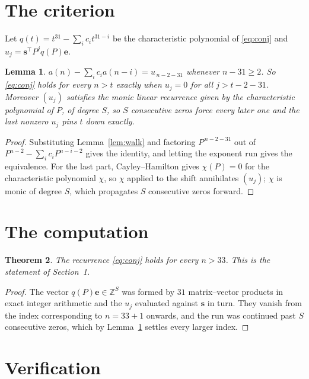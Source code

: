 \documentclass[11pt,a4paper]{article}
\theoremstyle{plain}
\newtheorem{theorem}{Theorem}
\newtheorem{lemma}[theorem]{Lemma}
\theoremstyle{definition}
\begin{document}
\section{The criterion}

Let $q(t)=t^{31}-\sum_i c_i t^{31-i}$ be the characteristic polynomial of
\eqref{eq:conj} and $u_j=\mathbf{s}^{\!\top}P^{j}q(P)\mathbf{e}$.

\begin{lemma}\label{lem:crit}
$a(n)-\sum_i c_i a(n-i)=u_{\,n-2-31}$ whenever $n-31\ge2$. So \eqref{eq:conj}
holds for every $n>t$ exactly when $u_j=0$ for all $j>t-2-31$. Moreover $(u_j)$
satisfies the monic linear recurrence given by the characteristic polynomial of $P$, of
degree $S$, so $S$ consecutive zeros force every later one and the last nonzero $u_j$ pins
$t$ down exactly.
\end{lemma}

\begin{proof}
Substituting Lemma~\ref{lem:walk} and factoring $P^{\,n-2-31}$ out of
$P^{n-2}-\sum_i c_i P^{n-i-2}$ gives the identity, and letting the exponent run gives the
equivalence. For the last part, Cayley--Hamilton gives $\chi(P)=0$ for the characteristic
polynomial $\chi$, so $\chi$ applied to the shift annihilates $(u_j)$; $\chi$ is monic of
degree $S$, which propagates $S$ consecutive zeros forward.
\end{proof}

\section{The computation}

\begin{theorem}
The recurrence \eqref{eq:conj} holds for every $n>33$. This is the statement of
Section~1.
\end{theorem}

\begin{proof}
The vector $q(P)\mathbf{e}\in\mathbb{Z}^{S}$ was formed by $31$ matrix--vector
products in exact integer arithmetic and the $u_j$ evaluated against $\mathbf{s}$ in turn.
They vanish from the index corresponding to $n=33+1$ onwards, and the run was continued
past $S$ consecutive zeros, which by Lemma~\ref{lem:crit} settles every larger index.
\end{proof}

\section{Verification}
\end{document}

